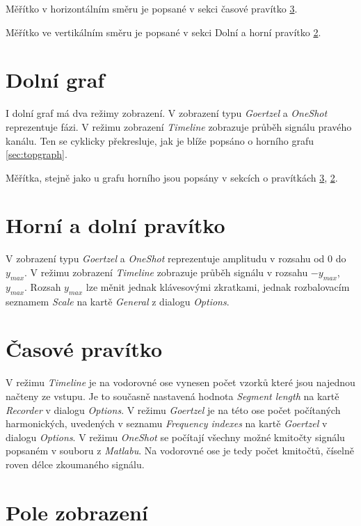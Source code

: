 Měřítko v horizontálním směru je popsané v sekci časové pravítko \ref{sec:timeruler}.


Měřítko ve vertikálním směru je popsané v sekci Dolní a horní pravítko \ref{sec:vertruler}.


\section{Dolní graf}


I dolní graf má dva režimy zobrazení. V zobrazení typu \emph{Goertzel} a \emph{OneShot} reprezentuje fázi. V režimu zobrazení \emph{Timeline} zobrazuje průběh signálu pravého kanálu. Ten se cyklicky překresluje, jak je blíže popsáno o horního grafu \ref{sec:topgraph}.

Měřítka, stejně jako u grafu horního jsou popsány v sekcích o pravítkách  \ref{sec:timeruler}, \ref{sec:vertruler}.

\section{Horní a dolní pravítko}
\label{sec:vertruler}

V zobrazení typu \emph{Goertzel} a \emph{OneShot} reprezentuje amplitudu v rozsahu od $0$ do $y_{max}$. V režimu zobrazení \emph{Timeline} zobrazuje průběh signálu v rozsahu $-y_{max}$,$y_{max}$. Rozsah $y_{max}$ lze měnit jednak klávesovými zkratkami, jednak rozbalovacím seznamem \emph{Scale} na kartě \emph{General} z dialogu \emph{Options}.

\section{Časové pravítko}
\label{sec:timeruler}

V režimu \emph{Timeline} je na vodorovné ose vynesen počet vzorků které jsou najednou načteny ze vstupu. Je to současně nastavená hodnota \emph{Segment length} na kartě \emph{Recorder} v dialogu \emph{Options}. V režimu \emph{Goertzel} je na této ose počet počítaných harmonických, uvedených v seznamu \emph{Frequency indexes} na kartě \emph{Goertzel} v dialogu \emph{Options}. V režimu \emph{OneShot} se počítají všechny možné kmitočty signálu popsaném v souboru z \emph{Matlabu}. Na vodorovné ose je tedy počet kmitočtů, číselně roven délce zkoumaného signálu.

\section{Pole zobrazení}


